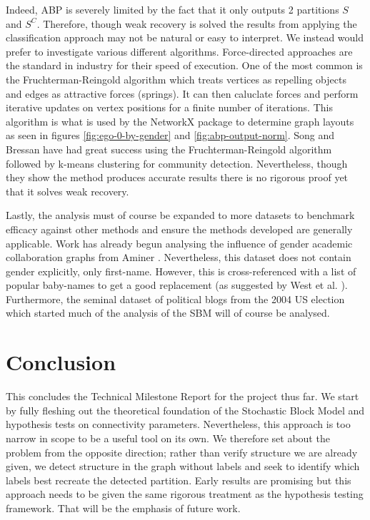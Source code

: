 \documentclass[]{article}
\begin{document}
\begin{multicols*}{2}
Indeed, ABP is severely limited by the fact that it only outputs 2 partitions $S$ and $S^C$. Therefore, though weak recovery is solved the results from applying the classification approach may not be natural or easy to interpret. We instead would prefer to investigate various different algorithms. Force-directed approaches are the standard in industry for their speed of execution. One of the most common is the Fruchterman-Reingold algorithm which treats vertices as repelling objects and edges as attractive forces (springs). It can then caluclate forces and perform iterative updates on vertex positions for a finite number of iterations. This algorithm is what is used by the NetworkX package \cite{networkx} to determine graph layouts as seen in figures \ref{fig:ego-0-by-gender} and \ref{fig:abp-output-norm}. Song and Bressan \cite{force-directed} have had great success using the Fruchterman-Reingold algorithm followed by k-means clustering for community detection. Nevertheless, though they show the method produces accurate results there is no rigorous proof yet that it solves weak recovery.

Lastly, the analysis must of course be expanded to more datasets to benchmark efficacy against other methods and ensure the methods developed are generally applicable. Work has already begun analysing the influence of gender academic collaboration graphs from Aminer \cite{aminer}. Nevertheless, this dataset does not contain gender explicitly, only first-name. However, this is cross-referenced with a list of popular baby-names to get a good replacement (as suggested by West et al. \cite{gender-scholarship}). Furthermore, the seminal dataset of political blogs from the 2004 US election \cite{polblogs} which started much of the analysis of the SBM will of course be analysed.

\section{Conclusion}

This concludes the Technical Milestone Report for the project thus far. We start by fully fleshing out the theoretical foundation of the Stochastic Block Model and hypothesis tests on connectivity parameters. Nevertheless, this approach is too narrow in scope to be a useful tool on its own. We therefore set about the problem from the opposite direction; rather than verify structure we are already given, we detect structure in the graph without labels and seek to identify which labels best recreate the detected partition. Early results are promising but this approach needs to be given the same rigorous treatment as the hypothesis testing framework. That will be the emphasis of future work.

\printbibliography

\end{multicols*}
\end{document}
